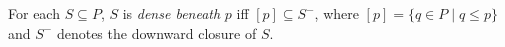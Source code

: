 For each $S \subseteq P$, $S$ is \emph{dense beneath} $p$ iff $[p] \subseteq S^{-}$, where $[p] = \{q \in P \mid q \leq p\}$ and $S^{-}$ denotes the downward closure of $S$.
